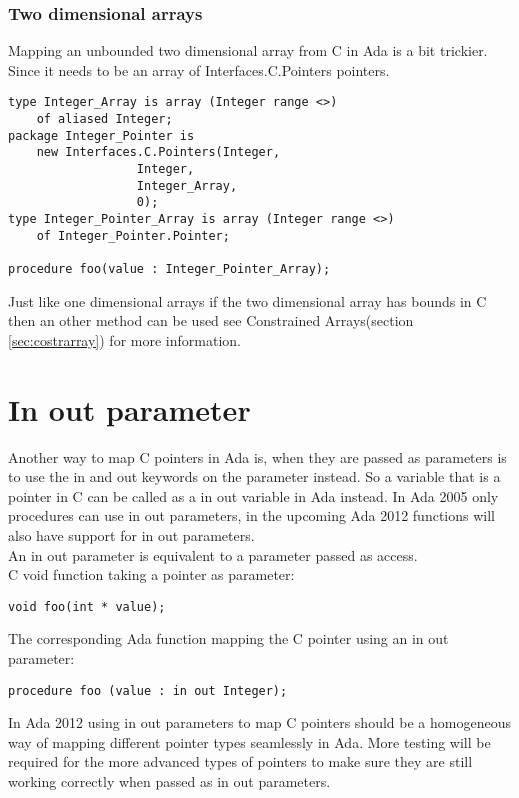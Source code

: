 \subsubsection{Two dimensional arrays}
Mapping an unbounded two dimensional array from C in Ada is a bit trickier. Since it needs to be an array of Interfaces.C.Pointers pointers.
\begin{lstlisting}
type Integer_Array is array (Integer range <>) 
	of aliased Integer;
package Integer_Pointer is 
	new Interfaces.C.Pointers(Integer, 
				  Integer, 
				  Integer_Array, 
				  0); 
type Integer_Pointer_Array is array (Integer range <>) 
	of Integer_Pointer.Pointer;

procedure foo(value : Integer_Pointer_Array);
\end{lstlisting}
Just like one dimensional arrays if the two dimensional array has bounds in C then an other method can be used see Constrained Arrays(section \ref{sec:costrarray}) for more information.
\section{In out parameter}\label{sec:inout}
Another way to map C pointers in Ada is, when they are passed as parameters is to use the in and out keywords on the parameter instead. So a variable that is a pointer in C can be called as a in out variable in Ada instead. In Ada 2005 only procedures can use in out parameters, in the upcoming Ada 2012\cite{ada2012} functions will also have support for in out parameters.
\\
An in out parameter is equivalent to a parameter passed as access.
\\
C void function taking a pointer as parameter:
\begin{lstlisting}
void foo(int * value);
\end{lstlisting}
The corresponding Ada function mapping the C pointer using an in out parameter:
\begin{lstlisting}
procedure foo (value : in out Integer);
\end{lstlisting}
In Ada 2012 using in out parameters to map C pointers should be a homogeneous way of mapping different pointer types seamlessly in Ada. More testing will be required for the more advanced types of pointers to make sure they are still working correctly when passed as in out parameters.
